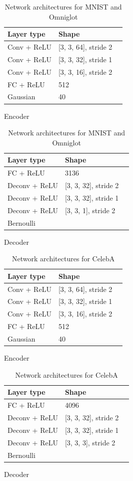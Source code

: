\begin{table}
\centering
\begin{subfigure}[h]{0.4\textwidth}
\begin{tabular}{lll}
\toprule
Layer type & Shape \\
\midrule
Conv + ReLU & [3, 3, 64], stride 2 \\
Conv + ReLU & [3, 3, 32], stride 1 \\
Conv + ReLU & [3, 3, 16], stride 2 \\
FC + ReLU & 512 \\
Gaussian & 40 \\
\bottomrule
\end{tabular}
\caption{Encoder}
\end{subfigure}
\begin{subfigure}[h]{0.4\textwidth}
\begin{tabular}{lll}
\toprule
Layer type & Shape \\
\midrule
FC + ReLU & 3136 \\
Deconv + ReLU & [3, 3, 32], stride 2 \\
Deconv + ReLU & [3, 3, 32], stride 1 \\
Deconv + ReLU & [3, 3, 1], stride 2 \\
Bernoulli & \\
\bottomrule
\end{tabular}
\caption{Decoder}
\end{subfigure}
\caption{Network architectures for MNIST and Omniglot}
\label{tab:mnist-arch}
\end{table}

\begin{table}
\centering
\begin{subfigure}[h]{0.4\textwidth}
\begin{tabular}{lll}
\toprule
Layer type & Shape \\
\midrule
Conv + ReLU & [3, 3, 64], stride 2 \\
Conv + ReLU & [3, 3, 32], stride 1 \\
Conv + ReLU & [3, 3, 16], stride 2 \\
FC + ReLU & 512 \\
Gaussian & 40 \\
\bottomrule
\end{tabular}
\caption{Encoder}
\end{subfigure}
\begin{subfigure}[h]{0.4\textwidth}
\begin{tabular}{lll}
\toprule
Layer type & Shape \\
\midrule
FC + ReLU & 4096 \\
Deconv + ReLU & [3, 3, 32], stride 2 \\
Deconv + ReLU & [3, 3, 32], stride 1 \\
Deconv + ReLU & [3, 3, 3], stride 2 \\
Bernoulli & \\
\bottomrule
\end{tabular}
\caption{Decoder}
\end{subfigure}
\caption{Network architectures for CelebA}
\label{tab:celeba-arch}
\end{table}

